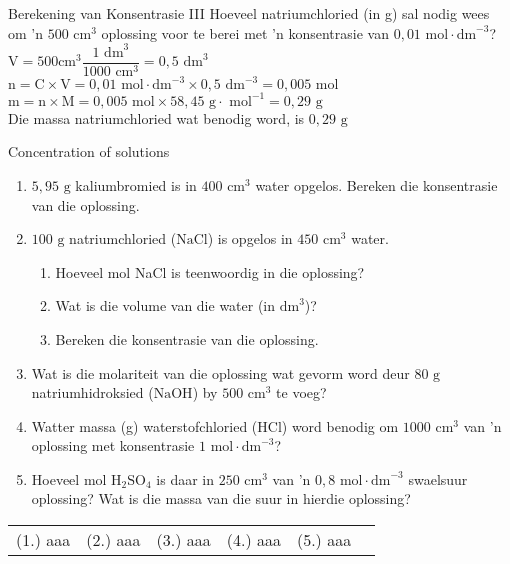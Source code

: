       \begin{wex}{Berekening van Konsentrasie III }
{
\label{m38712*id283476}Hoeveel natriumchloried (in g) sal nodig wees om 'n $500 {\text{ cm}}^{3}$ oplossing voor te berei met 'n konsentrasie van $0,01 \text{ mol} \cdot \text{dm}^{-3}$?
   }
{
$\text{V}= 500 \text{cm}^{3} \dfrac{1 \text{ dm}^{3}}{1 000 \text{ cm}^{3}}=0,5 {\text{ dm}}^{3}$
$\text{n}=\text{C} \times \text{V}= 0,01 \text{ mol} \cdot \text{dm}^{-3} \times 0,5 \text{ dm}^{-3} = 0,005 \text{ mol}$
$\text{m}=\text{n} \times \text{M}= 0,005 \text{ mol} \times 58,45 \text{ g} \cdot \text{ mol}^{-1} = 0,29 \text{ g}$\\
Die massa natriumchloried wat benodig word, is $0,29 \text{ g}$ 
}
    \end{wex}
    \noindent
\label{m38712*secfhsst!!!underscore!!!id1879}
            \begin{exercises}{ Concentration of solutions
      }
            \nopagebreak \noindent
      \label{m38712*id283713}\begin{enumerate}[noitemsep, label=\textbf{\arabic*}. ] 
\item $5,95 \text{ g}$ kaliumbromied is in $400 {\text{ cm}}^{3}$ water opgelos. Bereken die konsentrasie van die oplossing.
\item $100 \text{ g}$ natriumchloried ($\text{NaCl}$) is opgelos in $450 {\text{ cm}}^{3}$ water.
  \begin{enumerate}[noitemsep, label=\textbf{\alph*}. ] 
    \item Hoeveel mol NaCl is teenwoordig in die oplossing?
    \item Wat is die volume van die water (in ${\text{dm}}^{3}$)?
    \item Bereken die konsentrasie van die oplossing.
\end{enumerate}
\item Wat is die molariteit van die oplossing wat gevorm word deur $80 \text{ g}$ natriumhidroksied ($\text{NaOH}$) by $500 {\text{ cm}}^{3}$ te voeg? 
\item Watter massa (g) waterstofchloried ($\text{HCl}$) word benodig om $1000 {\text{ cm}}^{3}$ van 'n oplossing met konsentrasie $1 \text{ mol} \cdot {\text{dm}}^{-3}$?
\item Hoeveel mol $\text{H}{}_{2}\text{SO}{}_{4}$ is daar in $250 {\text{ cm}}^{3}$ van 'n $0,8 \text{ mol} \cdot \text{dm}^{-3}$ swaelsuur oplossing? Wat is die massa van die suur in hierdie oplossing?
\end{enumerate}
\practiceinfo
\par 
 \par \begin{tabular}[h]{cccccc}
 (1.) aaa  &  (2.) aaa  &  (3.) aaa  &  (4.) aaa  &  (5.) aaa  & \end{tabular}
\end{exercises}
